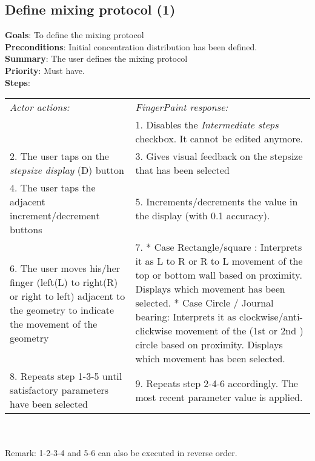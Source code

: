 \begin{appendices}
  \section{Define mixing protocol (1)}
  \label{mixprot1}
  \textbf{Goals}: To define the mixing protocol\\
  \textbf{Preconditions}: Initial concentration distribution has been defined.\\
  \textbf{Summary}: The user defines the mixing protocol\\
  \textbf{Priority}: Must have.\\
  \textbf{Steps}: \\
  \begin{tabular}{ p{} p{} }
  	\emph{Actor actions:} & \emph{FingerPaint response:} \\
    & 1.     Disables the \emph{Intermediate steps} checkbox. It cannot be edited anymore.\\
    2. The user taps on the \emph{stepsize display} (D) button & 3.	Gives visual feedback on the stepsize that has been selected\\
    4. The user taps the adjacent increment/decrement buttons & 5.	Increments/decrements the value in the display (with 0.1 accuracy). \\
    6. The user moves his/her finger (left(L) to right(R) or right to left) adjacent to the geometry to indicate the movement of the geometry & 7.	* Case Rectangle/square : Interprets it as L to R or R to L movement of the top or bottom wall based on proximity. Displays which movement has been selected. * Case Circle / Journal bearing: Interprets it as clockwise/anti-clickwise movement of the (1st or 2nd ) circle based on proximity. Displays which movement has been selected.\\
    8.	Repeats step 1-3-5 until satisfactory parameters have been selected & 9.	Repeats step 2-4-6 accordingly. The most recent parameter value is applied.\\
  \end{tabular}
  \\
\\Remark: 1-2-3-4 and 5-6 can also be executed in reverse order.


\end{appendices}
